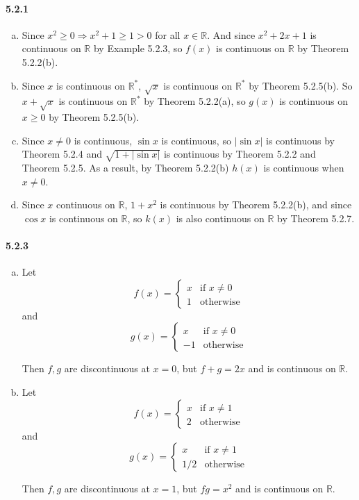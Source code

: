 \documentclass[11pt]{article}
\begin{document}
	\paragraph{5.2.1}
		\begin{enumerate}[(a)]
			\item Since $x^2 \geq 0 \Rightarrow x^2 + 1 \geq 1 > 0$ for all $x \in \mathbb{R}$. And since $x^2 + 2x + 1$ is continuous on $\mathbb{R}$ by Example 5.2.3, so $f(x)$ is continuous on $\mathbb{R}$ by Theorem 5.2.2(b).
			\item Since $x$ is continuous on $\mathbb{R^*}$, $\sqrt{x}$ is continuous on $\mathbb{R^*}$ by Theorem 5.2.5(b). So $x + \sqrt{x}$ is continuous on $\mathbb{R^*}$ by Theorem 5.2.2(a), so $g(x)$ is continuous on $x \geq 0$ by Theorem 5.2.5(b).
			\item Since $x \neq 0$ is continuous, $\sin x$ is continuous, so $|\sin x|$ is continuous by Theorem 5.2.4 and $\sqrt{1 + |\sin x|}$ is continuous by Theorem 5.2.2 and Theorem 5.2.5. As a result, by Theorem 5.2.2(b) $h(x)$ is continuous when $x \neq 0$. 
			\item Since $x$ continuous on $\mathbb{R}$, $1 + x^2$ is continuous by Theorem 5.2.2(b), and since $\cos x$ is continuous on $\mathbb{R}$, so $k(x)$ is also continuous on $\mathbb{R}$ by Theorem 5.2.7.
		\end{enumerate}
	\paragraph{5.2.3}
		\begin{enumerate}[(a)]
			\item Let 
				\[f(x) = \begin{cases}
					x & \text{if } x \neq 0\\
					1 &  \text{otherwise}
				\end{cases} \]
				and
				\[g(x) = \begin{cases}
					x & \text{if } x \neq 0\\
					-1 &  \text{otherwise}
				\end{cases} \]
				
				Then $f, g$ are discontinuous at $x = 0$, but $f + g = 2x$ and is continuous on $\mathbb{R}$.
			\item Let 
				\[f(x) = \begin{cases}
					x & \text{if } x \neq 1\\
					2 &  \text{otherwise}
				\end{cases} \]
				and
				\[g(x) = \begin{cases}
					x & \text{if } x \neq 1\\
					1/2 &  \text{otherwise}
				\end{cases} \]
				
				Then $f, g$ are discontinuous at $x = 1$, but $fg = x^2$ and is continuous on $\mathbb{R}$.
		\end{enumerate}
\end{document}
